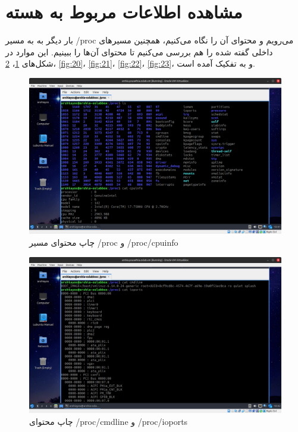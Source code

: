 \documentclass[12pt]{article}
\begin{document}
	\section{مشاهده اطلاعات مربوط به هسته}
	بار دیگر به به مسیر /proc می‌رویم و محتوای آن را نگاه می‌کنیم، همچنین مسیر‌های داخلی گفته شده را هم بررسی می‌کنیم تا محتوای آن‌ها را ببینیم. این موارد در شکل‌های 
	\ref{fig:18}،
	\ref{fig:19}،
	\ref{fig:20}،
	\ref{fig:21}،
	\ref{fig:22}،
	\ref{fig:23}، و
	به تفکیک آمده است.
	
	\begin{figure}[H]
		\centering
		\includegraphics[width=\textwidth]{report3-resources/19.png}
		\caption{چاپ محتوای مسیر /proc و /proc/cpuinfo}
		\label{fig:18}
	\end{figure}
	\begin{figure}[H]
		\centering
		\includegraphics[width=\textwidth]{report3-resources/20.png}
		\caption{چاپ محتوای /proc/cmdline و /proc/ioports}
		\label{fig:19}
	\end{figure}
\end{document}
